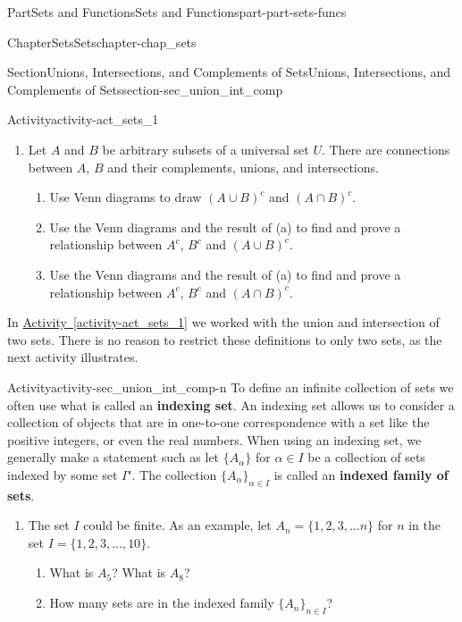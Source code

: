 \documentclass[oneside,10pt,]{book}
\newcommand{\xreffont}{\relax}
\newcommand{\terminology}[1]{\textbf{#1}}
\numberwithin{equation}{chapter}
\begin{document}
\begin{partptx}{Part}{Sets and Functions}{}{Sets and Functions}{}{}{part-part-sets-funcs}
\begin{chapterptx}{Chapter}{Sets}{}{Sets}{}{}{chapter-chap_sets}
\begin{sectionptx}{Section}{Unions, Intersections, and Complements of Sets}{}{Unions, Intersections, and Complements of Sets}{}{}{section-sec_union_int_comp}
\begin{activity}{Activity}{}{activity-act_sets_1}
\begin{enumerate}[font=\bfseries,label=(\alph*),ref=\alph*]
\begin{enumerate}[font=\bfseries,label=(\roman*),ref=\theenumi.\roman*]
\item{}Determine the elements in \(A^{c} \cup B^{c}\) and \(A^{c} \cap B^{c}\).%
\end{enumerate}%
\item{}Let \(A\) and \(B\) be arbitrary subsets of a universal set \(U\). There are connections between \(A\), \(B\) and their complements, unions, and intersections.%
\begin{enumerate}[font=\bfseries,label=(\roman*),ref=\theenumi.\roman*]%
\item{}Use Venn diagrams to draw \((A \cup B)^c\) and \((A \cap B)^c\).%
\item{}Use the Venn diagrams and the result of (a) to find and prove a relationship between \(A^c\), \(B^c\) and \((A \cup B)^c\).%
\item{}Use the Venn diagrams and the result of (a) to find and prove a relationship between \(A^c\), \(B^c\) and \((A \cap B)^c\).%
\end{enumerate}%
\end{enumerate}%
\end{activity}%
In \hyperref[activity-act_sets_1]{Activity~{\xreffont\ref{activity-act_sets_1}}} we worked with the union and intersection of two sets. There is no reason to restrict these definitions to only two sets, as the next activity illustrates.%
\begin{activity}{Activity}{}{activity-sec_union_int_comp-n}%
%
To define an infinite collection of sets we often use what is called an \terminology{indexing set}. An indexing set allows us to consider a collection of objects that are in one-to-one correspondence with a set like the positive integers, or even the real numbers. When using an indexing set, we generally make a statement such as \textasciigrave{}\textasciigrave{}let \(\{A_{\alpha}\}\) for \(\alpha \in I\) be a collection of sets indexed by some set \(I\)". The collection \(\{A_{\alpha}\}_{\alpha \in I}\) is called an \terminology{indexed family of sets}.%
\begin{enumerate}[font=\bfseries,label=(\alph*),ref=\alph*]%
\item{}The set \(I\) could be finite. As an example, let \(A_{n} = \{1, 2, 3, \ldots n\}\) for \(n\) in the set \(I = \{1,2,3, \ldots, 10\}\).%
\begin{enumerate}[font=\bfseries,label=(\roman*),ref=\theenumi.\roman*]%
\item{}What is \(A_5\)? What is \(A_{8}\)?%
\item{}How many sets are in the indexed family \(\{A_n\}_{n \in I}\)?%

\end{enumerate}
\end{enumerate}
\end{activity}
\end{sectionptx}
\end{chapterptx}
\end{partptx}
\end{document}
